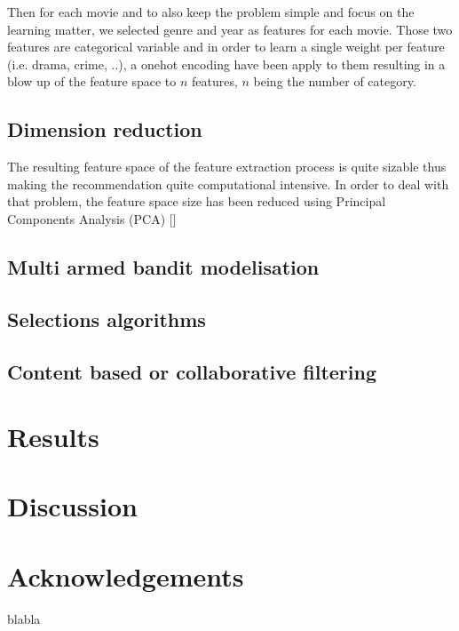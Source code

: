 \documentclass[letterpaper]{article}
\begin{document}
Then for each movie and to also keep the problem simple and focus on the learning matter, we selected genre and year as features for each movie. Those two features are categorical variable and in order to learn a single weight per feature (i.e. drama, crime, ..), a onehot encoding have been apply to them resulting in a blow up of the feature space to $n$ features, $n$ being the number of category.

\begin{table}[h]
\vskip 0.25cm
\caption{Movise feature space}
\end{table}


\subsection{Dimension reduction}

The resulting feature space of the feature extraction process is quite sizable thus making the recommendation quite computational intensive.
In order to deal with that problem, the feature space size has been reduced using Principal Components Analysis (PCA) [\cite{principalcompanalysis}]  


\subsection{Multi armed bandit modelisation}


\subsection{Selections algorithms}



\subsection{Content based or collaborative filtering}



\section{Results}


\section{Discussion}


\section{Acknowledgements}

blabla

\footnotesize


\end{document}

